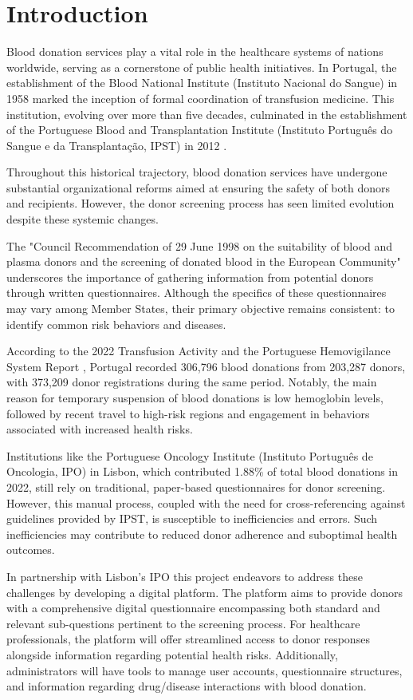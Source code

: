 %
%
\chapter{Introduction} \label{cap:intro}
Blood donation services play a vital role in the healthcare systems of nations worldwide, serving as a cornerstone of public health initiatives. In Portugal, the establishment of the Blood National Institute (Instituto Nacional do Sangue) in 1958 marked the inception of formal coordination of transfusion medicine. This institution, evolving over more than five decades, culminated in the establishment of the Portuguese Blood and Transplantation Institute (Instituto Português do Sangue e da Transplantação, IPST) in 2012 \cite{IPST_Historia}.

Throughout this historical trajectory, blood donation services have undergone substantial organizational reforms aimed at ensuring the safety of both donors and recipients. However, the donor screening process has seen limited evolution despite these systemic changes.

The "Council Recommendation of 29 June 1998 on the suitability of blood and plasma donors and the screening of donated blood in the European Community" underscores the importance of gathering information from potential donors through written questionnaires. Although the specifics of these questionnaires may vary among Member States, their primary objective remains consistent: to identify common risk behaviors and diseases.

According to the 2022 Transfusion Activity and the Portuguese Hemovigilance System Report \cite{IPST:2023:Report}, Portugal recorded 306,796 blood donations from 203,287 donors, with 373,209 donor registrations during the same period. Notably, the main reason for temporary suspension of blood donations is low hemoglobin levels, followed by recent travel to high-risk regions and engagement in behaviors associated with increased health risks.

Institutions like the Portuguese Oncology Institute (Instituto Português de Oncologia, IPO) in Lisbon, which contributed 1.88\% of total blood donations in 2022, still rely on traditional, paper-based questionnaires for donor screening. However, this manual process, coupled with the need for cross-referencing against guidelines provided by IPST, is susceptible to inefficiencies and errors. Such inefficiencies may contribute to reduced donor adherence and suboptimal health outcomes.

In partnership with Lisbon's IPO this project endeavors to address these challenges by developing a digital platform. The platform aims to provide donors with a comprehensive digital questionnaire encompassing both standard and relevant sub-questions pertinent to the screening process. For healthcare professionals, the platform will offer streamlined access to donor responses alongside information regarding potential health risks. Additionally, administrators will have tools to manage user accounts, questionnaire structures, and information regarding drug/disease interactions with blood donation.

